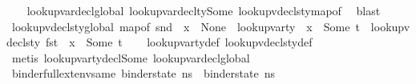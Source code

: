 \begin{isabellebody}
%
\isadelimproof
\ \ %
\endisadelimproof
%
\isatagproof
{}\isamarkupfalse%
\ lookup{\isacharunderscore}{\kern0pt}var{\isacharunderscore}{\kern0pt}decl{\isacharunderscore}{\kern0pt}global\ lookup{\isacharunderscore}{\kern0pt}var{\isacharunderscore}{\kern0pt}decl{\isacharunderscore}{\kern0pt}ty{\isacharunderscore}{\kern0pt}Some\ lookup{\isacharunderscore}{\kern0pt}vdecls{\isacharunderscore}{\kern0pt}ty{\isacharunderscore}{\kern0pt}map{\isacharunderscore}{\kern0pt}of\ \isamarkupfalse%
\ blast%
\endisatagproof
{\isafoldproof}%
%
\isadelimproof
\isanewline
%
\endisadelimproof
\isanewline
{}\isamarkupfalse%
\ lookup{\isacharunderscore}{\kern0pt}vdecls{\isacharunderscore}{\kern0pt}ty{\isacharunderscore}{\kern0pt}global{\isacharunderscore}{\kern0pt}{}{\isacharcolon}{\kern0pt}\ {\isachardoublequoteopen}map{\isacharunderscore}{\kern0pt}of\ {\isacharparenleft}{\kern0pt}snd\ {\isasymLambda}{\isacharparenright}{\kern0pt}\ x\ {\isacharequal}{\kern0pt}\ None\ {\isasymLongrightarrow}\ lookup{\isacharunderscore}{\kern0pt}var{\isacharunderscore}{\kern0pt}ty\ {\isasymLambda}\ x\ {\isacharequal}{\kern0pt}\ Some\ t\ {\isasymLongrightarrow}\ lookup{\isacharunderscore}{\kern0pt}vdecls{\isacharunderscore}{\kern0pt}ty\ {\isacharparenleft}{\kern0pt}fst\ {\isasymLambda}{\isacharparenright}{\kern0pt}\ x\ {\isacharequal}{\kern0pt}\ Some\ t{\isachardoublequoteclose}\isanewline
%
\isadelimproof
\ \ %
\endisadelimproof
%
\isatagproof
{}\isamarkupfalse%
\ lookup{\isacharunderscore}{\kern0pt}var{\isacharunderscore}{\kern0pt}ty{\isacharunderscore}{\kern0pt}def\ lookup{\isacharunderscore}{\kern0pt}vdecls{\isacharunderscore}{\kern0pt}ty{\isacharunderscore}{\kern0pt}def\isanewline
\ \ \isamarkupfalse%
\ {\isacharparenleft}{\kern0pt}metis\ lookup{\isacharunderscore}{\kern0pt}var{\isacharunderscore}{\kern0pt}ty{\isacharunderscore}{\kern0pt}decl{\isacharunderscore}{\kern0pt}Some\ lookup{\isacharunderscore}{\kern0pt}var{\isacharunderscore}{\kern0pt}decl{\isacharunderscore}{\kern0pt}global{\isacharunderscore}{\kern0pt}{}{\isacharparenright}{\kern0pt}%
\endisatagproof
{\isafoldproof}%
%
\isadelimproof
\isanewline
%
\endisadelimproof
\isanewline
{}\isamarkupfalse%
\ binder{\isacharunderscore}{\kern0pt}full{\isacharunderscore}{\kern0pt}ext{\isacharunderscore}{\kern0pt}env{\isacharunderscore}{\kern0pt}same{\isacharcolon}{\kern0pt}\ {\isachardoublequoteopen}binder{\isacharunderscore}{\kern0pt}state\ ns{}\ {\isacharequal}{\kern0pt}\ binder{\isacharunderscore}{\kern0pt}state\ ns{}\ {\isasymLongrightarrow}\ \isanewline

\end{isabellebody}
